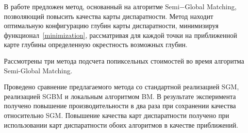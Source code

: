 \startconclusionpage

В работе предложен метод, основанный на алгоритме Semi$-$Global Matching, позволяющий повысить качества карты диспаратности. Метод находит оптимальную конфигурацию глубин карты диспаратности, минимизируя функционал~\ref{minimization}, рассматривая для каждой точки на приближенной карте глубины определенную окрестность возможных глубин.

Рассмотрены три метода подсчета попиксельных стоимостей во время алгоритма Semi-Global Matching. 

Проведено сравнение предлагаемого метода со стандартной реализацией SGM, реализацией SGBM и локальным алгоритмом BM. В результате эксперимента получено повышение производительности в два раза при сохранении качества относительно SGM. Повышение качества карт диспаратности получено при использовании карт диспаратности обоих алгоритмов в качестве приближений.



